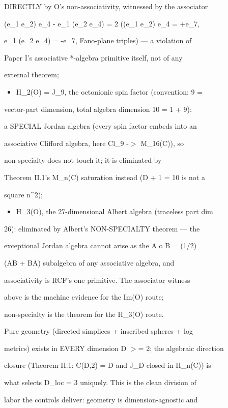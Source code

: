 \documentclass[11pt,a4paper]{article}
\theoremstyle{definition}
\begin{document}
    DIRECTLY by O's non-associativity, witnessed by the associator

    (e\_1 e\_2) e\_4 - e\_1 (e\_2 e\_4) = 2 ((e\_1 e\_2) e\_4 = +e\_7,

    e\_1 (e\_2 e\_4) = -e\_7, Fano-plane triples) — a violation of

    Paper I's associative *-algebra primitive itself, not of any

    external theorem;

\begin{itemize}[leftmargin=1.4em]
\item H\_2(O) = J\_9, the octonionic spin factor (convention: 9 =
\end{itemize}
    vector-part dimension, total algebra dimension 10 = 1 + 9):

    a SPECIAL Jordan algebra (every spin factor embeds into an

    associative Clifford algebra, here Cl\_9 -$>$ M\_16(C)), so

    non-specialty does not touch it; it is eliminated by

    Theorem II.1's M\_n(C) saturation instead (D + 1 = 10 is not a

    square n\^{}2);

\begin{itemize}[leftmargin=1.4em]
\item H\_3(O), the 27-dimensional Albert algebra (traceless part dim
\end{itemize}
    26): eliminated by Albert's NON-SPECIALTY theorem — the

    exceptional Jordan algebra cannot arise as the A o B = (1/2)

    (AB + BA) subalgebra of any associative algebra, and

    associativity is RCF's one primitive. The associator witness

    above is the machine evidence for the Im(O) route;

    non-specialty is the theorem for the H\_3(O) route.

Pure geometry (directed simplices + inscribed spheres + log

metrics) exists in EVERY dimension D $>$= 2; the algebraic direction

closure (Theorem II.1: C(D,2) = D and J\_D closed in H\_n(C)) is

what selects D\_loc = 3 uniquely. This is the clean division of

labor the controls deliver: geometry is dimension-agnostic and
\end{document}
